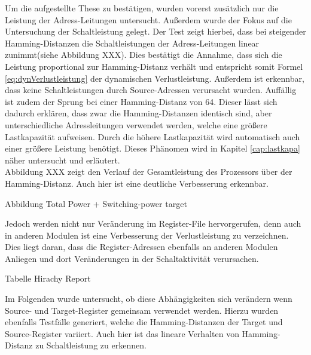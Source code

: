 Um die aufgestellte These zu bestätigen, wurden vorerst zusätzlich nur die Leistung der Adress-Leitungen untersucht. Außerdem wurde der Fokus auf die Untersuchung der Schaltleistung gelegt. Der Test zeigt hierbei, dass bei steigender Hamming-Distanzen die Schaltleistungen der Adress-Leitungen linear zunimmt(siehe Abbildung XXX). Dies bestätigt die Annahme, dass sich die Leistung proportional zur Hamming-Distanz verhält und entspricht somit Formel \ref{eq:dynVerlustleistung} der dynamischen Verlustleistung. Außerdem ist erkennbar, dass keine Schaltleistungen durch Source-Adressen verursacht wurden.
Auffällig ist zudem der Sprung bei einer Hamming-Distanz von 64. Dieser lässt sich dadurch erklären, dass zwar die Hamming-Distanzen identisch sind, aber unterschiedliche Adressleitungen verwendet werden, welche eine größere Lastkapazität aufweisen. Durch die höhere Lastkapazität wird automatisch auch einer größere Leistung benötigt. Dieses Phänomen wird in Kapitel \ref{cap:lastkapa} näher untersucht und erläutert.\\
Abbildung XXX zeigt den Verlauf der Gesamtleistung des Prozessors über der Hamming-Distanz. Auch hier ist eine deutliche Verbesserung erkennbar.

Abbildung Total Power + Switching-power target


Jedoch werden nicht nur Veränderung im Register-File hervorgerufen, denn auch in anderen Modulen ist eine Verbesserung der Verlustleistung zu verzeichnen. Dies liegt daran, dass die Register-Adressen ebenfalls an anderen Modulen Anliegen und dort Veränderungen in der Schaltaktivität verursachen.

Tabelle Hirachy Report

Im Folgenden wurde untersucht, ob diese Abhängigkeiten sich verändern wenn Source- und Target-Register gemeinsam verwendet werden. Hierzu wurden ebenfalls Testfälle generiert, welche die Hamming-Distanzen der Target und Source-Register variiert. Auch hier ist das lineare Verhalten von Hamming-Distanz zu Schaltleistung zu erkennen.


